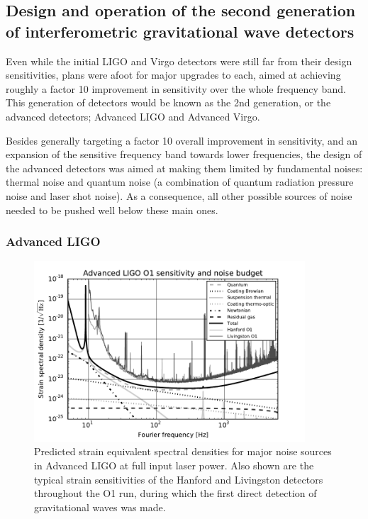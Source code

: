 \subsection{Design and operation of the second generation of interferometric gravitational wave detectors}\label{subsec:2ndgen}

Even while the initial LIGO and Virgo detectors were still far from their design sensitivities, plans were afoot for major  upgrades to each, aimed at achieving roughly a factor 10 improvement in sensitivity over the whole frequency band. 
This generation of detectors would be known as the 2nd generation, or the advanced detectors; Advanced LIGO and 
Advanced Virgo. 

Besides generally targeting a factor 10 overall improvement in sensitivity, and an expansion of the sensitive 
frequency band towards lower frequencies, the design of the advanced detectors was aimed at making them 
limited by fundamental noises: thermal noise and quantum noise (a combination of quantum radiation pressure noise 
and laser shot noise).
As a consequence, all other possible sources of noise needed to be pushed well below these main ones.

\subsubsection{Advanced LIGO}
\begin{figure}[htb]
	\begin{center}
		\includegraphics[width=0.9\textwidth]{aLIGOnbudget_gray.pdf}
		\caption{\label{fig:aLIGOnbudget}Predicted strain equivalent spectral densities for major noise sources in Advanced LIGO at full input laser power. Also shown are the typical strain sensitivities of the Hanford and Livingston detectors throughout the O1 run, during which the first direct detection of gravitational waves was made.}
	\end{center}
\end{figure}

